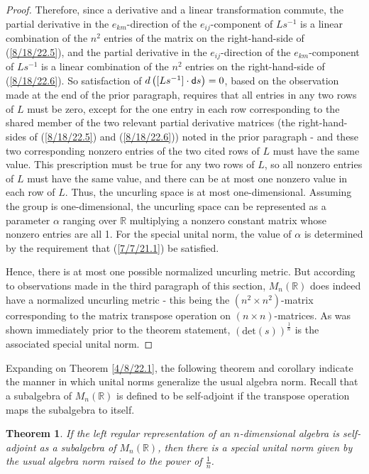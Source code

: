 \documentclass{amsart}
\numberwithin{equation}{section}
\newtheorem{theorem}{Theorem}
\theoremstyle{definition}
\numberwithin{theorem}{section}
\begin{document}
\begin{proof}
Therefore, since a derivative and a linear transformation commute, the partial derivative in the $e_{km}$-direction of the $e_{ij}$-component of $Ls^{-1}$ is a linear combination of the $n^2$ entries of the matrix on the right-hand-side of (\ref{8/18/22.5}), and  the partial derivative in the $e_{ij}$-direction of the $e_{km}$-component of $Ls^{-1}$ is a linear combination of the $n^2$ entries on the right-hand-side of (\ref{8/18/22.6}).
So satisfaction of \mbox{$d\left([Ls^{-1}]\cdot {\sf d}s\right) = 0$,} based on the observation made at the end of the prior paragraph, requires that all entries in any two rows of $L$ must be zero, except for the one entry in each row corresponding to the shared member of the two relevant partial derivative matrices (the right-hand-sides of (\ref{8/18/22.5}) and (\ref{8/18/22.6})) noted in the prior paragraph - and these two corresponding nonzero entries of the two cited rows of $L$ must have the same value.  This prescription must be true for any two rows of $L$, so all nonzero entries of $L$ must have the same value, and there can be at most one nonzero value in each row of $L$.  Thus, the uncurling space is at most one-dimensional. Assuming the group is one-dimensional, the uncurling space can be represented as a parameter $\alpha$ ranging over $\mathbb{R}$ multiplying a nonzero constant matrix whose nonzero entries are all 1.  
For the special unital norm, the value of $\alpha$ is determined by the requirement that (\ref{7/7/21.1}) be satisfied. 


Hence, there is at most one possible normalized uncurling metric.  But according to observations made in the third paragraph of this section, $ M_n(\mathbb{R})$ does indeed have a normalized uncurling metric - this being the $(n^2\times n^2)$-matrix corresponding to the matrix transpose operation on $(n\times n)$-matrices.  As was shown immediately prior to the theorem statement, $(\mbox{det}(s))^{\frac{1}{n}}$ is the associated special unital norm.  
 \end{proof}
 
 Expanding on Theorem \ref{4/8/22.1}, the following theorem and corollary indicate the manner in which unital norms generalize the usual algebra norm.  Recall that a subalgebra of $M_n(\mathbb{R})$ is defined to be self-adjoint if the transpose operation maps the subalgebra to itself.
 
  \begin{theorem}\label{5/13/22.1} If the left regular representation of an $n$-dimensional algebra is self-adjoint as a subalgebra of $M_n(\mathbb{R})$, then there is a special unital norm given by the usual algebra norm raised to the power of $\frac{1}{n}$.
\end{theorem}
\end{document}
